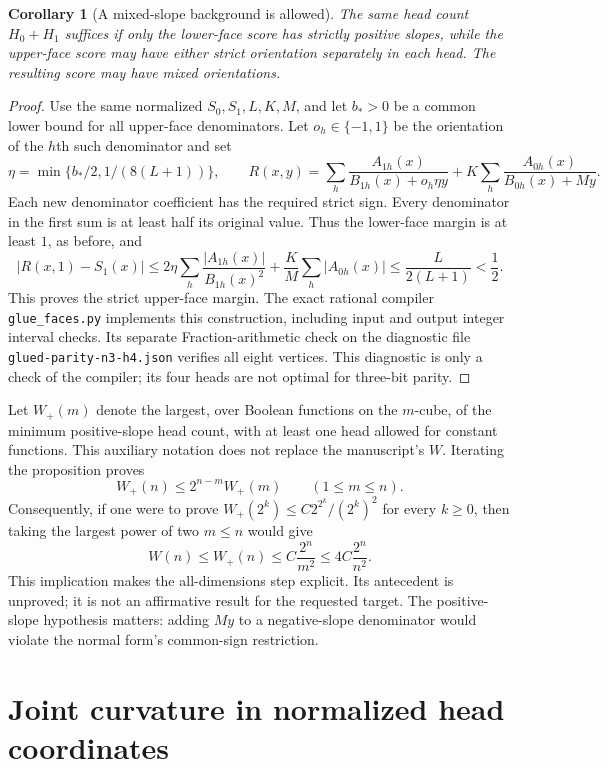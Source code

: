 \documentclass[11pt]{article}
\newtheorem{corollary}[proposition]{Corollary}
\begin{document}
\begin{corollary}[A mixed-slope background is allowed]
The same head count $H_0+H_1$ suffices if only the lower-face score has
strictly positive slopes, while the upper-face score may have either
strict orientation separately in each head. The resulting score may
have mixed orientations.
\end{corollary}
\begin{proof}
Use the same normalized $S_0,S_1,L,K,M$, and let $b_*>0$ be a common
lower bound for all upper-face denominators. Let $o_h\in\{-1,1\}$ be
the orientation of the $h$th such denominator and set
\[
 \eta=\min\{b_*/2,1/(8(L+1))\},\qquad
 R(x,y)=\sum_h\frac{A_{1h}(x)}{B_{1h}(x)+o_h\eta y}
       +K\sum_h\frac{A_{0h}(x)}{B_{0h}(x)+My}.
\]
Each new denominator coefficient has the required strict sign.
Every denominator in the first sum is at least half its original
value. Thus the lower-face margin is at least $1$, as before, and
\[
 |R(x,1)-S_1(x)|
 \le2\eta\sum_h\frac{|A_{1h}(x)|}{B_{1h}(x)^2}
     +\frac K M\sum_h|A_{0h}(x)|
 \le\frac{L}{2(L+1)}<\frac12.
\]
This proves the strict upper-face margin. The exact rational compiler
\texttt{glue\_faces.py} implements this construction, including input
and output integer interval checks. Its separate Fraction-arithmetic
check on the diagnostic file \texttt{glued-parity-n3-h4.json} verifies
all eight vertices. This diagnostic is only a check of the compiler;
its four heads are not optimal for three-bit parity.
\end{proof}

Let $W_+(m)$ denote the largest, over Boolean functions on the $m$-cube,
of the minimum positive-slope head count, with at least one head allowed
for constant functions. This auxiliary notation does not replace the
manuscript's $W$. Iterating the proposition proves
\[
 W_+(n)\leq2^{n-m}W_+(m)\qquad(1\leq m\leq n).
\]
Consequently, if one were to prove
$W_+(2^k)\leq C2^{2^k}/(2^k)^2$ for every $k\geq0$, then taking
the largest power of two $m\leq n$ would give
\[
 W(n)\leq W_+(n)\leq C\frac{2^n}{m^2}
 \leq4C\frac{2^n}{n^2}.
\]
This implication makes the all-dimensions step explicit. Its antecedent
is unproved; it is not an affirmative result for the requested target.
The positive-slope hypothesis matters: adding $My$ to a negative-slope
denominator would violate the normal form's common-sign restriction.

\section{Joint curvature in normalized head coordinates}
\end{document}
